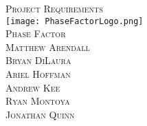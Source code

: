 \begin{titlepage}
\begin{center} 
\vspace*{2cm}
\textsc{\Huge Project Requirements}\\[4cm]


\texttt{[image: PhaseFactorLogo.png]}\\[.5cm]
\textsc{\LARGE Phase Factor}\\[3cm]

\textsc{\large Matthew Arendall}\\[0.2cm]
\textsc{\large Bryan DiLaura} \\[0.2cm]
\textsc{\large Ariel Hoffman} \\[0.2cm]
\textsc{\large Andrew Kee} \\[0.2cm]
\textsc{\large Ryan Montoya} \\[0.2cm]
\textsc{\large Jonathan Quinn} \\[0.2cm]

\end{center}
\end{titlepage}
